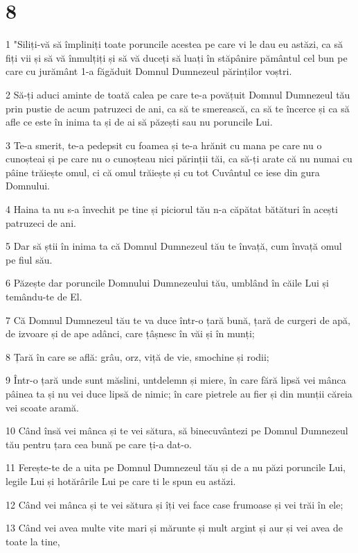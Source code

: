 \chapter{8}

\par 1 "Siliți-vă să împliniți toate poruncile acestea pe care vi le dau eu astăzi, ca să fiți vii și să vă înmulțiți și să vă duceți să luați în stăpânire pământul cel bun pe care cu jurământ 1-a făgăduit Domnul Dumnezeul părinților voștri.
\par 2 Să-ți aduci aminte de toată calea pe care te-a povățuit Domnul Dumnezeul tău prin pustie de acum patruzeci de ani, ca să te smerească, ca să te încerce și ca să afle ce este în inima ta și de ai să păzești sau nu poruncile Lui.
\par 3 Te-a smerit, te-a pedepsit cu foamea și te-a hrănit cu mana pe care nu o cunoșteai și pe care nu o cunoșteau nici părinții tăi, ca să-ți arate că nu numai cu pâine trăiește omul, ci că omul trăiește și cu tot Cuvântul ce iese din gura Domnului.
\par 4 Haina ta nu s-a învechit pe tine și piciorul tău n-a căpătat bătături în acești patruzeci de ani.
\par 5 Dar să știi în inima ta că Domnul Dumnezeul tău te învață, cum învață omul pe fiul său.
\par 6 Păzește dar poruncile Domnului Dumnezeului tău, umblând în căile Lui și temându-te de El.
\par 7 Că Domnul Dumnezeul tău te va duce într-o țară bună, țară de curgeri de apă, de izvoare și de ape adânci, care țâșnesc în văi și în munți;
\par 8 Țară în care se află: grâu, orz, viță de vie, smochine și rodii;
\par 9 Într-o țară unde sunt măslini, untdelemn și miere, în care fără lipsă vei mânca pâinea ta și nu vei duce lipsă de nimic; în care pietrele au fier și din munții căreia vei scoate aramă.
\par 10 Când însă vei mânca și te vei sătura, să binecuvântezi pe Domnul Dumnezeul tău pentru țara cea bună pe care ți-a dat-o.
\par 11 Ferește-te de a uita pe Domnul Dumnezeul tău și de a nu păzi poruncile Lui, legile Lui și hotărârile Lui pe care ti le spun eu astăzi.
\par 12 Când vei mânca și te vei sătura și îți vei face case frumoase și vei trăi în ele;
\par 13 Când vei avea multe vite mari și mărunte și mult argint și aur și vei avea de toate la tine,
